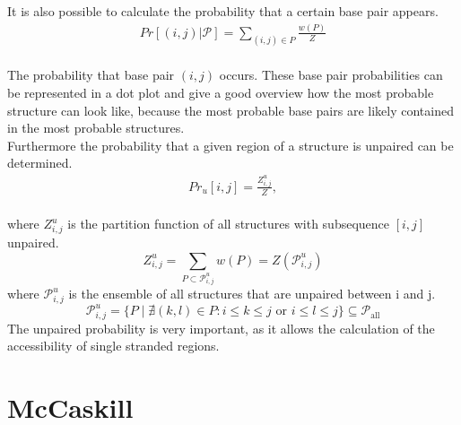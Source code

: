 \documentclass[11pt,a4paper]{report}
\newcommand{\str}{P} %
\newcommand{\ens}{\mathcal{\str}} %
\newcommand{\ensAll}{\ens_{\text{all}}} %
\newcommand{\parr}{Z} %
\newcommand{\parrun}{\parr_{i,j}^u} %
\begin{document}
It is also possible to calculate the probability that a certain base pair appears.\\
\begin{align*}
Pr[(i,j)|\ens] = \sum\limits_{(i,j) \in \str} \frac{w(\str)}{\parr}
\end{align*}\\
The probability that base pair $(i,j)$ occurs. These base pair probabilities can be represented in a dot plot and give a good overview how the most probable structure can look like, because the most probable base pairs are likely contained in the most probable structures.\\
Furthermore the probability that a given region of a structure is unpaired can be determined.\\
\begin{align*}
Pr_u [i,j] = \frac{Z_{i,j}^{u}}{Z},
\end{align*}\\
where $Z_{i,j}^{u}$ is the partition function of all structures with subsequence $[i,j]$ unpaired.
\begin{equation*}
\parrun = \sum\limits_{\str \subset \ens_{i,j}^u} w(\str) = \parr(\ens_{i,j}^u)
\end{equation*}
where $\ens_{i,j}^u$ is the ensemble of all structures that are unpaired between i and j.
\begin{equation*}
\ens_{i,j}^u = \{\str \mid \nexists (k,l) \in \str : i\leq k \leq j \text{ or } i \leq l \leq j \} \subseteq \ensAll
\end{equation*}
The unpaired probability is very important, as it allows the calculation of the accessibility of single stranded regions.
\newpage
\section*{McCaskill}
\end{document}

